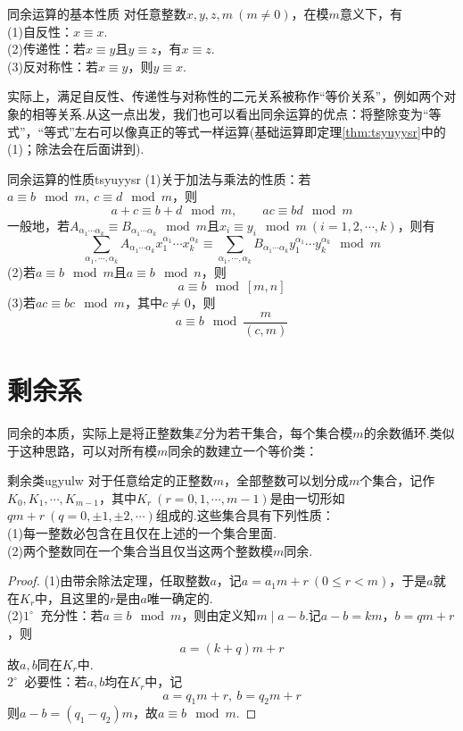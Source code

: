 \documentclass[lang=cn, zihao=5]{elegantbook}
\newcommand{\buzhou}[1]{$#1^{\circ} \ $}
\begin{document}
\begin{theorem}{同余运算的基本性质}
	对任意整数$x,y,z,m~(m \neq 0)$，在模$m$意义下，有 \\
	(1)自反性：$x \equiv x$. \\
	(2)传递性：若$x \equiv y$且$y \equiv z$，有$x \equiv z$. \\
	(3)反对称性：若$x \equiv y$，则$y \equiv x$.
\end{theorem}
\begin{remark}
	实际上，满足自反性、传递性与对称性的二元关系被称作“等价关系”，例如两个对象的相等关系.从这一点出发，我们也可以看出同余运算的优点：将整除变为“等式”，“等式”左右可以像真正的等式一样运算(基础运算即定理\ref{thm:tsyuyysr}中的(1)；除法会在后面讲到).
\end{remark}

\begin{theorem}{同余运算的性质}{tsyuyysr}
	(1)关于加法与乘法的性质：若$a \equiv b \mod m,~c \equiv d \mod m$，则$$a+c \equiv b+d \mod m, \qquad ac \equiv bd \mod m$$
	一般地，若$A_{\alpha _1 \cdots \alpha _k} \equiv B_{\alpha _1 \cdots \alpha _k} \mod m$且$x_i \equiv y_i \mod m~(i=1,2,\cdots ,k)$，则有$$\sum_{\alpha _1, \cdots ,\alpha _k} A_{\alpha _1 \cdots \alpha _k} x_1^{\alpha _1} \cdots x_k^{\alpha _k} \equiv \sum_{\alpha _1, \cdots ,\alpha _k} B_{\alpha _1 \cdots \alpha _k} y_1^{\alpha _1} \cdots y_k^{\alpha _k} \mod m$$
	(2)若$a \equiv b \mod m$且$a \equiv b \mod n$，则$$a \equiv b \mod [m,n]$$
	(3)若$ac \equiv bc \mod m$，其中$c \neq 0$，则$$a \equiv b \mod \frac{m}{(c,m)}$$
\end{theorem}


\section{剩余系}

同余的本质，实际上是将正整数集$\mathbb{Z}$分为若干集合，每个集合模$m$的余数循环.类似于这种思路，可以对所有模$m$同余的数建立一个等价类：

\begin{theorem}{剩余类}{ugyulw}
	对于任意给定的正整数$m$，全部整数可以划分成$m$个集合，记作$K_0,K_1, \cdots ,K_{m-1}$，其中$K_r~(r=0,1,\cdots ,m-1)$是由一切形如$qm+r~(q=0,\pm 1,\pm 2,\cdots )$组成的.这些集合具有下列性质： \\
	(1)每一整数必包含在且仅在上述的一个集合里面. \\
	(2)两个整数同在一个集合当且仅当这两个整数模$m$同余.
\end{theorem}
\begin{proof}
	(1)由带余除法定理，任取整数$a$，记$a=a_1m + r~(0 \leq r < m)$，于是$a$就在$K_r$中，且这里的$r$是由$a$唯一确定的. \\
	(2)\buzhou{1} 充分性：若$a \equiv b \mod m$，则由定义知$m \mid a-b$.记$a-b = km$，$b=qm + r$，则$$a = (k+q)m +r$$
	故$a,b$同在$K_r$中. \\
	\buzhou{2} 必要性：若$a,b$均在$K_r$中，记$$a=q_1m+r,~b=q_2m+r$$
	则$a-b = (q_1-q_2)m$，故$a \equiv b \mod m$.
\end{proof}
\end{document}
